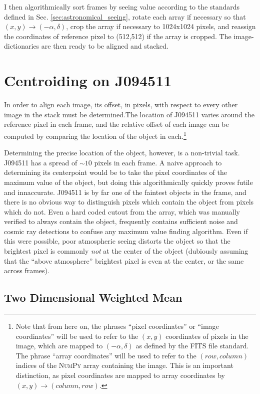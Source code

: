 \documentclass[a4paper,11pt]{article}
\begin{document}
I then algorithmically sort frames by seeing value according to the standards defined in Sec. \ref{sec:astronomical_seeing}, rotate each array if necessary so that $(x,y) \rightarrow (-\alpha, \delta)$, crop the array if necessary to 1024x1024 pixels, and reassign the coordinates of reference pixel to (512,512) if the array is cropped. The image-dictionaries are then ready to be aligned and stacked.

\section{Centroiding on J094511}

In order to align each image, its offset, in pixels, with respect to every other image in the stack must be determined.The location of J094511 varies around the reference pixel in each frame, and the relative offset of each image can be computed by comparing the location of the object in each.\footnote{Note that from here on, the phrases ``pixel coordinates'' or ``image coordinates'' will be used to refer to the $(x,y)$ coordinates of pixels in the image, which are mapped to $(-\alpha,\delta)$ as defined by the FITS file standard\cite{FITS_standard}. The phrase ``array coordinates'' will be used to refer to the $(row,column)$ indices of the \textsc{NumPy} array containing the image. This is an important distinction, as pixel coordinates are mapped to array coordinates by $(x,y) \rightarrow (column, row)$.}

Determining the precise location of the object, however, is a non-trivial task. J094511 has a spread of $\sim10$ pixels in each frame. A naive approach to determining its centerpoint would be to take the pixel coordinates of the maximum value of the object, but doing this algorithmically quickly proves futile and innaccurate. J094511 is by far one of the faintest objects in the frame, and there is no obvious way to distinguish pixels which contain the object from pixels which do not. Even a hard coded cutout from the array, which was manually verified to always contain the object, frequently contains sufficient noise and cosmic ray detections to confuse any maximum value finding algorithm. Even if this were possible, poor atmospheric seeing distorts the object so that the brightest pixel is commonly \textit{not} at the center of the object (dubiously assuming that the ``above atmosphere'' brightest pixel is even at the center, or the same across frames).

\subsection{Two Dimensional Weighted Mean}\label{sec:flux_weighted_mean}
\end{document}
